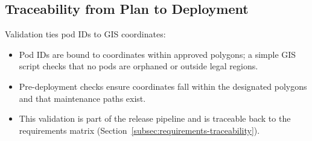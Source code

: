 \subsection{Traceability from Plan to Deployment}
\label{subsec:traceability}
Validation ties pod IDs to \ac{GIS} coordinates:
\begin{itemize}[nosep]
  \item Pod IDs are bound to coordinates within approved polygons; a simple \ac{GIS} script checks that no pods are orphaned or outside legal regions.
  \item Pre-deployment checks ensure coordinates fall within the designated polygons and that maintenance paths exist.
  \item This validation is part of the release pipeline and is traceable back to the requirements matrix (Section~\ref{subsec:requirements-traceability}).
\end{itemize}
